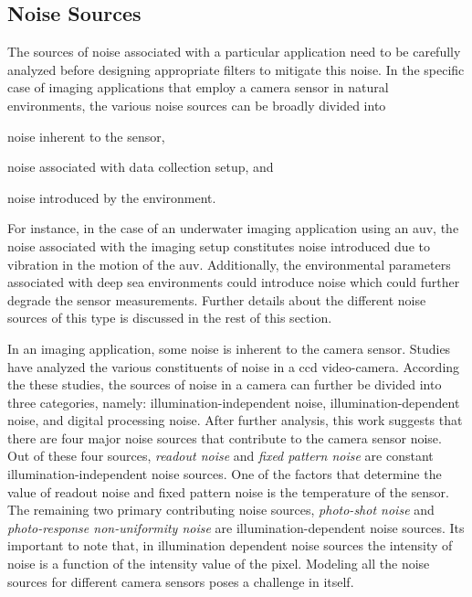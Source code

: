 \subsection{Noise Sources}
\label{sec:noise_sources}

The sources of noise associated with a particular  application need to be carefully analyzed before designing appropriate filters to mitigate this noise.
In the specific case of imaging applications that employ a camera sensor in natural environments, the various noise sources can be broadly divided
into \begin{enumerate*}[label=(\roman*)] \item noise inherent to the sensor, \item noise associated with data collection setup, and \item noise introduced by the environment. \end{enumerate*} For instance, in the case of an underwater imaging application using an \gls{auv}, the noise associated with the imaging setup constitutes noise introduced due to vibration in the motion of the \gls{auv}. Additionally, the environmental parameters associated with deep sea environments could introduce noise which could further degrade the sensor measurements. Further details about the different noise sources of this type is discussed in the rest of this section.

In an imaging application, some noise is inherent to the camera sensor. Studies \cite{irie} have analyzed the various constituents of noise 
in a \gls{ccd} video-camera. According the these studies, the sources of noise in a camera can further be divided into three categories, namely: illumination-independent noise, illumination-dependent noise, and digital processing noise. After further analysis, this work suggests that there are four major noise sources that contribute to the camera sensor noise. Out of these four sources, \emph{readout noise} and \emph{fixed pattern noise} are constant illumination-independent noise sources. One of the factors that determine the value of readout noise and fixed pattern noise is the temperature of the sensor. The remaining two primary contributing noise sources, \emph{photo-shot noise} and \emph{photo-response non-uniformity noise} are illumination-dependent noise sources. Its important to note that, in illumination dependent noise sources the intensity of noise is a function of the intensity value of the pixel. Modeling all the noise sources for different camera sensors poses a challenge in itself.

